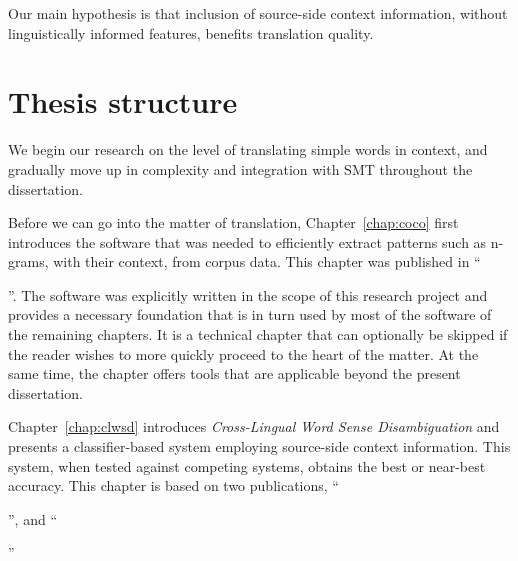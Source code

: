 Our main hypothesis is that inclusion of source-side context information, without
linguistically informed features, benefits translation quality.

\section{Thesis structure}

We begin our research on the level of translating simple words in context, and
gradually move up in complexity and integration with SMT throughout the
dissertation.

{\nobibliography*
Before we can go into the matter of translation, Chapter~\ref{chap:coco} first introduces the software that was needed
to efficiently extract patterns such as n-grams, with their context, from corpus data. This chapter was published in
``{\footnotesize\begin{NoHyper}\end{NoHyper}}''. The software
was explicitly written in the scope of this research project and provides a necessary foundation that is in turn used by most of the
software of the remaining chapters. It is a technical chapter that can optionally be skipped if the
reader wishes to more quickly proceed to the heart of the matter. At the same time, the chapter offers tools that are
applicable beyond the present dissertation.

Chapter~\ref{chap:clwsd} introduces \emph{Cross-Lingual Word Sense
Disambiguation} and presents a classifier-based system employing source-side
context information. This system, when tested against competing systems, obtains the
best or near-best accuracy. This chapter is based on two publications,
``\begin{NoHyper}{\footnotesize{}}'', and ``{\footnotesize{}}\end{NoHyper}''

}
